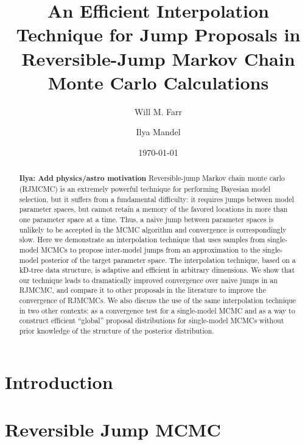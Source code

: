 \documentclass[prd,preprint]{revtex4}
\newcommand{\ilya}[1]{{\color{red} \bf Ilya: #1}}
\begin{document}
\title{An Efficient Interpolation Technique for Jump Proposals in
  Reversible-Jump Markov Chain Monte Carlo Calculations}

\date{\today}

\author{Will M. Farr}


\author{Ilya Mandel}


\begin{abstract}
\ilya{Add physics/astro motivation}
  Reversible-jump Markov chain monte carlo (RJMCMC) is an extremely
  powerful technique for performing Bayesian model selection, but it
  suffers from a fundamental difficulty: it requires jumps between
  model parameter spaces, but cannot retain a memory of the favored
  locations in more than one parameter space at a time.  Thus, a naive
  jump between parameter spaces is unlikely to be accepted in the MCMC
  algorithm and convergence is correspondingly slow.  Here we
  demonstrate an interpolation technique that uses samples from
  single-model MCMCs to propose inter-model jumps from an
  approximation to the single-model posterior of the target parameter
  space.  The interpolation technique, based on a kD-tree
  data structure, is adaptive and efficient in arbitrary dimensions.
  We show that our technique leads to dramatically improved convergence
  over naive jumps in an RJMCMC, and compare it to other proposals in
  the literature to improve the convergence of RJMCMCs.  We also
  discuss the use of the same interpolation technique in two other
  contexts: as a convergence test for a single-model MCMC and as a way
  to construct efficient ``global'' proposal distributions for
  single-model MCMCs without prior knowledge of the structure of the
  posterior distribution.
\end{abstract}

\maketitle

\section{Introduction}

\section{Reversible Jump MCMC}
\end{document}

